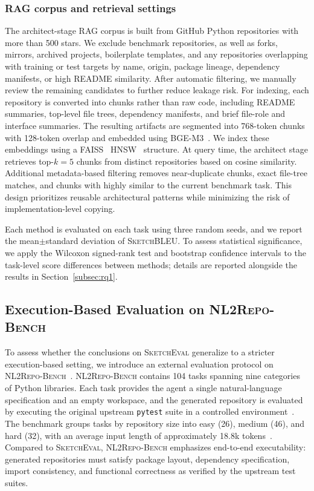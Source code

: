 \documentclass[format=acmsmall, review=false, screen=true]{acmart}
\newcommand{\sketcheval}{\textsc{SketchEval}\xspace}
\newcommand{\sketchbleu}{\textsc{SketchBLEU}\xspace}
\newcommand{\nlrepobench}{\textsc{NL2Repo-Bench}\xspace}
\begin{document}
\subsubsection{RAG corpus and retrieval settings}
The architect-stage RAG corpus is built from GitHub Python repositories with more than 500 stars. We exclude benchmark repositories, as well as forks, mirrors, archived projects, boilerplate templates, and any repositories overlapping with training or test targets by name, origin, package lineage, dependency manifests, or high README similarity. After automatic filtering, we manually review the remaining candidates to further reduce leakage risk. For indexing, each repository is converted into chunks rather than raw code, including README summaries, top-level file trees, dependency manifests, and brief file-role and interface summaries. The resulting artifacts are segmented into 768-token chunks with 128-token overlap and embedded using BGE-M3~\cite{Chen2024BGEM3}. We index these embeddings using a FAISS~\cite{Douze2024Faiss} HNSW~\cite{Malkov2016HNSW} structure. At query time, the architect stage retrieves top-$k{=}5$ chunks from distinct repositories based on cosine similarity. Additional metadata-based filtering removes near-duplicate chunks, exact file-tree matches, and chunks with highly similar to the current benchmark task. This design prioritizes reusable architectural patterns while minimizing the risk of implementation-level copying.

Each method is evaluated on each task using three random seeds, and we report the mean$\pm$standard deviation of \sketchbleu. To assess statistical significance, we apply the Wilcoxon signed-rank test and bootstrap confidence intervals to the task-level score differences between methods; details are reported alongside the results in Section~\ref{subsec:rq1}.

\subsection{Execution-Based Evaluation on \nlrepobench}
\label{subsec:nl2repobench}

To assess whether the conclusions on \sketcheval generalize to a stricter execution-based setting, we introduce an external evaluation protocol on \nlrepobench~\cite{Ding2025NL2RepoBench}. \nlrepobench contains 104 tasks spanning nine categories of Python libraries. Each task provides the agent a single natural-language specification and an empty workspace, and the generated repository is evaluated by executing the original upstream \texttt{pytest} suite in a controlled environment~\cite{Ding2025NL2RepoBench}. The benchmark groups tasks by repository size into easy (26), medium (46), and hard (32), with an average input length of approximately 18.8k tokens~\cite{Ding2025NL2RepoBench}. Compared to \sketcheval, \nlrepobench emphasizes end-to-end executability: generated repositories must satisfy package layout, dependency specification, import consistency, and functional correctness as verified by the upstream test suites.
\end{document}
